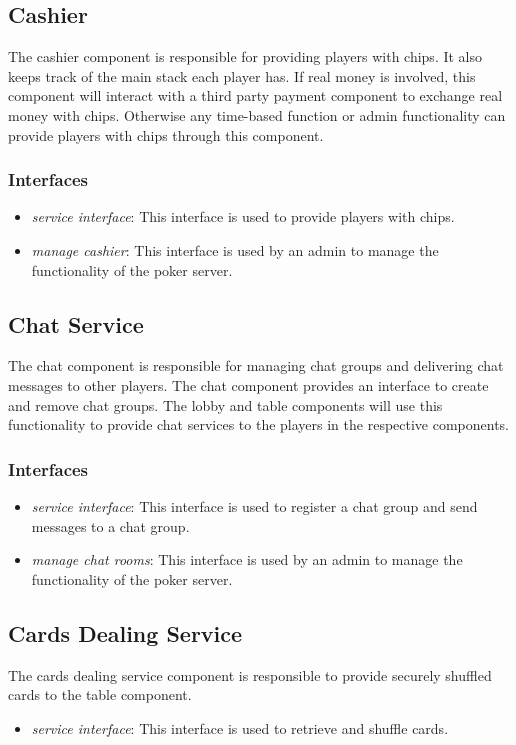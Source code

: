 \documentclass[a4paper,11pt]{report}
\begin{document}
\subsection{Cashier}
The cashier component is responsible for providing players with chips. It also keeps track of the main stack each player has. If real money is involved, this component will interact with a third party payment component to exchange real money with chips. Otherwise any time-based function or admin functionality can provide players with chips through this component.
\subsubsection{Interfaces}
\begin{itemize}
\item \emph{service interface}: This interface is used to provide players with chips. 
\item \emph{manage cashier}: This interface is used by an admin to manage the functionality of the poker server.
\end{itemize}

\subsection{Chat Service}
The chat component is responsible for managing chat groups and delivering chat messages to other players. The chat component provides an interface to create and remove chat groups. The lobby and table components will use this functionality to provide chat services to the players in the respective components.
\subsubsection{Interfaces}
\begin{itemize}
\item \emph{service interface}: This interface is used to register a chat group and send messages to a chat group.
\item \emph{manage chat rooms}: This interface is used by an admin to manage the functionality of the poker server.
\end{itemize}

\subsection{Cards Dealing Service}
The cards dealing service component is responsible to provide securely shuffled cards to the table component.
\begin{itemize}
\item \emph{service interface}: This interface is used to retrieve and shuffle cards.
\end{itemize}
\end{document}
